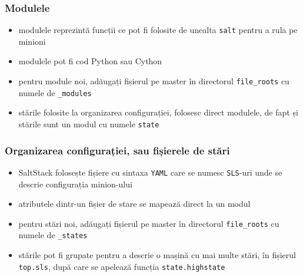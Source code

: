 \documentclass[compress]{beamer}
\begin{document}
\begin{frame}
\frametitle{Modulele}

\begin{itemize}[<+->]
  \item modulele reprezintă funcții ce pot fi folosite de unealta \texttt{salt} pentru a rula pe minioni
  \item modulele pot fi cod Python sau Cython
  \item pentru module noi, adăugați fișierul pe master în directorul \texttt{file\_roots} cu numele de \texttt{\_modules}
  \item stările folosite la organizarea configurației, folosesc direct modulele, de fapt și stările sunt un modul cu numele \texttt{state}
\end{itemize}
\end{frame}

\begin{frame}
\frametitle{Organizarea configurației, sau fișierele de stări}

\begin{itemize}[<+->]
  \item SaltStack folosește fișiere cu sintaxa \texttt{YAML} care se numesc \texttt{SLS}-uri unde se descrie configurația minion-ului
  \item atributele dintr-un fișier de stare se mapează direct la un modul
  \item pentru stări noi, adăugați fișierul pe master în directorul \texttt{file\_roots} cu numele de \texttt{\_states}
  \item stările pot fi grupate pentru a descrie o mașină cu mai multe stări, în fișierul \texttt{top.sls}, după care se apelează funcția \texttt{state.highstate}
\end{itemize}
\end{frame}
\end{document}
